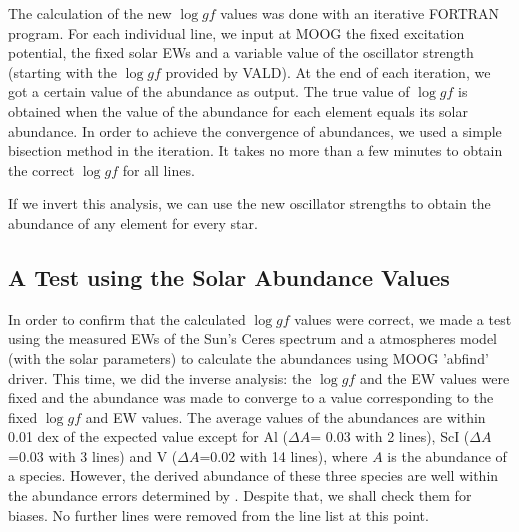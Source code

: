 \documentclass[dvips,12pt,a4paper]{report}
\begin{document}
{%

The calculation of the new $\log gf$ values was done with an iterative FORTRAN program. For each individual line, we input at MOOG the fixed excitation potential, the fixed solar EWs and a variable value of the oscillator strength (starting with the $\log gf$ provided by VALD). At the end of each iteration, we got a certain value of the abundance as output. The true value of $\log gf$ is obtained when the value of the abundance for each element equals its solar abundance. %
In order to achieve the convergence of abundances, we used a simple bisection method in the iteration. It takes no more than a few minutes to obtain the correct $\log gf$ for all lines.

If we invert this analysis, we can use the new oscillator strengths to obtain the abundance of any element for every star. %

\subsection {A Test using the Solar Abundance Values}

In order to confirm that the calculated $\log gf$ values were correct, we made a test using the measured EWs of the Sun's Ceres spectrum and a \citet{Kurucz-1993} atmospheres model (with the solar parameters) to calculate the abundances using MOOG 'abfind' driver. This time, we did the inverse analysis: the $\log gf$ and the EW values were fixed and the abundance was made to converge to a value corresponding to the fixed $\log gf$ and EW values. The average values of the abundances are within 0.01 dex of the expected value except for Al ($\Delta A$= 0.03 with 2 lines), ScI ($\Delta A$=0.03 with 3 lines) and V ($\Delta A$=0.02 with 14 lines), where $A$ is the abundance of a species. However, the derived abundance of these three species are well within the abundance errors determined by \citet{Anders-1989}. Despite that, we shall check them for biases. No further lines were removed from the line list at this point. %

}
\end{document}
